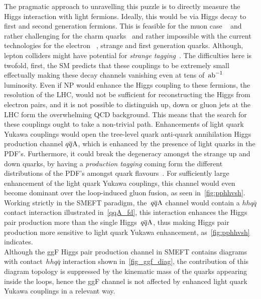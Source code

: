 The pragmatic approach to unravelling this puzzle is to directly measure the Higgs interaction with light fermions. Ideally, this would be via Higgs decay to first and second generation fermions. This is feasible for the muon case ~\cite{ATLAS:2020fzp,CMS:2020xwi} and rather challenging for the charm quarks~\cite{ATLAS-CONF-2021-021,ATLAS:2022ers,CMS:2019hve} and rather impossible with the current technologies for the electron~ \cite{Khachatryan:2014aep}, strange and first generation quarks. Although, lepton colliders might have potential for \emph{strange tagging}~\cite{Nakai:2020kuu}. The difficulties here is twofold, first, the SM predicts that these couplings to be extremely small effectually making these decay channels vanishing even at tens of~$\invab$ luminosity. Even if NP would enhance the Higgs coupling to these fermions, the resolution of the LHC, would not be sufficient for reconstructing the Higgs from electron pairs, and it is not possible to distinguish up, down or gluon jets at the LHC  form the overwhelming QCD background. This means that the search for these couplings ought to take a non-trivial path. Enhancements of light quark Yukawa couplings would open the tree-level quark anti-quark annihilation Higgs production channel $q\overline q \rm A$, which is enhanced by the presence of light quarks in the PDF's. Furthermore, it could break the degeneracy amongst the strange up and down quarks, by having a \emph{production tagging} coming form the different distributions of the PDF's  amongst quark flavours~\cite{Soreq:2016rae}.  For sufficiently large enhancement of the light quark Yukawa couplings, this channel would even become dominant over the loop-induced gluon fusion, as seen in~\autoref{fig:pphhvsh}. Working strictly in the  SMEFT paradigm, the~$q\overline q \rm A$ channel would contain a $hhq\bar q$ contact interaction illustrated in~\autoref{qqA_fd}, this interaction enhances the Higgs pair production more than the single Higgs~$q\overline q \rm A $, thus making Higgs pair production more sensitive to light quark Yukawa enhancement, as~\autoref{fig:pphhvsh} indicates. \\ Although the ggF Higgs pair production channel in SMEFT contains  diagrams with  contact~$hhq\bar q$  interaction shown in~\autoref{fig_ggf_diag}, the contribution of this diagram topology is suppressed by the kinematic mass of the quarks appearing inside the loops, hence the ggF channel is not affected by enhanced light quark Yukawa couplings in a relevant way. \\
